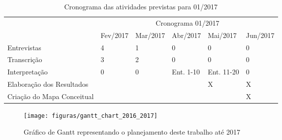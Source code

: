 \begin{table}[!htpb]
	\centering
	\begin{small} 
		\begin{tabular}{|p{5cm}|p{2cm}|p{2cm}|p{2cm}|p{2cm}|p{2cm}|}\hline
		 & \multicolumn{5}{c|}{Cronograma 01/2017}\\ \cline{2-6}
		\raisebox{1.5ex}{Entrevistas} & Fev/2017 & Mar/2017 & Abr/2017 & Mai/2017 & Jun/2017 \\ \hline
		Entrevistas   & 4 & 1 & 0 & 0 & 0 \\ \hline
		Transcrição   & 3 & 2 & 0 & 0 & 0 \\ \hline
		Interpretação & 0 & 0 & Ent. 1-10 & Ent. 11-20 & 0 \\ \hline
		Elaboração dos Resultados    &  &  &  & X & X \\ \hline
		Criação do Mapa Conceitual &   &   &   &   & X \\ \hline
		\end{tabular} 
	\end{small}
	\caption{Cronograma das atividades previstas para 01/2017}
	\label{table:cronograma_2017}
\end{table} 

\begin{figure}[!htb]
	\centering
	\texttt{[image: figuras/gantt\_chart\_2016\_2017]}
	\caption{Gráfico de Gantt representando o planejamento deste trabalho até 2017}
	\label{figure:gantt_chart_2016_2017}
\end{figure}